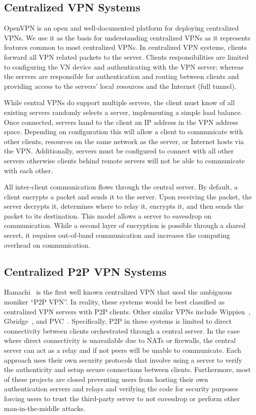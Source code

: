 \subsection{Centralized VPN Systems}
OpenVPN is an open and well-documented platform for deploying centralized VPNs.
We use it as the basis for understanding centralized VPNs as it represents
features common to most centralized VPNs.  In centralized VPN systems, clients
forward all VPN related packets to the server.  Clients responsibilities are
limited to configuring the VN device and authenticating with the VPN server;
whereas the servers are responsible for authentication and routing between
clients and providing access to the servers' local resources and the Internet
(full tunnel).

While central VPNs do support multiple servers, the client must know of all
existing servers randomly selects a server, implementing a simple load
balance.  Once connected, servers hand to the client an IP address in the
VPN address space.  Depending on configuration this will allow a client to
communicate with other clients, resources on the same network as the server,
or Internet hosts via the VPN.  Additionally, servers must be configured to
connect with all other servers otherwise clients behind remote servers will
not be able to communicate with each other.

All inter-client communication flows through the central server.  By default, a
client encrypts a packet and sends it to the server.  Upon receiving the packet,
the server decrypts it, determines where to relay it, encrypts it, and then
sends the packet to its destination.  This model allows a server to eavesdrop on
communication.  While a second layer of encryption is possible through a shared
secret, it requires out-of-band communication and increases the computing
overhead on communication.

\subsection{Centralized P2P VPN Systems}
Hamachi~\cite{hamachi} is the first well known centralized VPN that used the
ambiguous moniker ``P2P VPN''.  In reality, these systems would be best
classified as centralized VPN servers with P2P clients.  Other similar VPNs
include Wippien~\cite{wippien}, Gbridge~\cite{gbridge}, and PVC~\cite{pvc}.
Specifically, P2P in these systems is limited to direct connectivity between
clients orchestrated through a central server.  In the case where direct
connectivity is unavailable due to NATs or firewalls, the central server can
act as a relay and if not peers will be unable to communicate.  Each approach
uses their own security protocols that involve using a server to verify the
authenticity and setup secure connections between clients.  Furthermore, most
of these projects are closed preventing users from hosting their own
authentication servers and relays and verifying the code for security purposes
forcing users to trust the third-party server to not eavesdrop or perform other
man-in-the-middle attacks.

